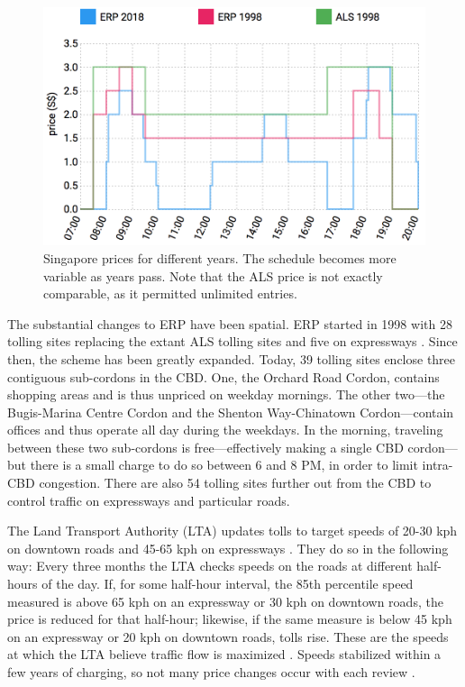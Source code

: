 \begin{figure}
	\includegraphics[width=1\textwidth]{../img/singapore-prices.png}
	\caption{Singapore prices for different years. The schedule becomes more variable as years pass. Note that the ALS price is not exactly comparable, as it permitted unlimited entries.}
	\label{fig:singapore-toll-schedule}
\end{figure}

The substantial changes to ERP have been spatial. ERP started in 1998 with 28 tolling sites replacing the extant ALS tolling sites and five on expressways \citep{Menon2010}. Since then, the scheme has been greatly expanded. Today, 39 tolling sites enclose three contiguous sub-cordons in the CBD. One, the Orchard Road Cordon, contains shopping areas and is thus unpriced on weekday mornings. The other two---the Bugis-Marina Centre Cordon and the Shenton Way-Chinatown Cordon---contain offices and thus operate all day during the weekdays. In the morning, traveling between these two sub-cordons is free---effectively making a single CBD cordon---but there is a small charge to do so between 6 and 8 PM, in order to limit intra-CBD congestion. There are also 54 tolling sites further out from the CBD to control traffic on expressways and particular roads.

The Land Transport Authority (LTA) updates tolls to target speeds of 20-30 kph on downtown roads and 45-65 kph on expressways \citep[pp. 6-7]{Menon2010}. They do so in the following way: Every three months the LTA checks speeds on the roads at different half-hours of the day. If, for some half-hour interval, the 85th percentile speed measured is above 65 kph on an expressway or 30 kph on downtown roads, the price is reduced for that half-hour; likewise, if the same measure is below 45 kph on an expressway or 20 kph on downtown roads, tolls rise. These are the speeds at which the LTA believe traffic flow is maximized \citet[p. 42]{Menon2000}. Speeds stabilized within a few years of charging, so not many price changes occur with each review \citet[p. 7]{Chin2009}.

